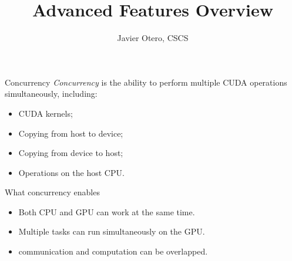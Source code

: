 \documentclass[aspectratio=43]{beamer}
\author{Javier Otero, CSCS}
\title{Advanced Features Overview}
\subtitle{}
\begin{document}
\cscstitle


\begin{frame}[fragile]{Concurrency}
    \emph{Concurrency} is the ability to perform multiple CUDA operations simultaneously, including:
    \begin{itemize}
        \item CUDA kernels;
        \item Copying from host to device;
        \item Copying from device to host;
        \item Operations on the host CPU.
    \end{itemize}

    \begin{info}{What concurrency enables}
        \begin{itemize}
            \item Both CPU and GPU can work at the same time.
            \item Multiple tasks can run simultaneously on the GPU.
            \item communication and computation can be overlapped.
        \end{itemize}
    \end{info}

\end{frame}
\end{document}
